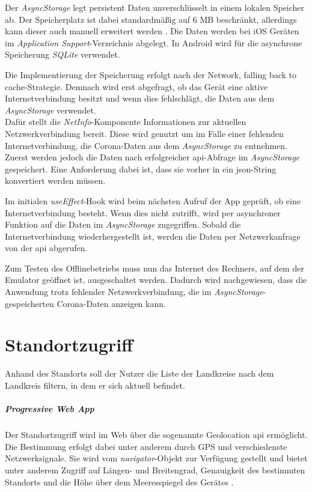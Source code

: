 Der \textit{AsyncStorage} legt persistent Daten unverschlüsselt in einem lokalen Speicher ab.
Der Speicherplatz ist dabei standardmäßig auf 6 MB beschränkt, allerdings kann dieser auch manuell erweitert werden \cite{Behrends.2018}.
Die Daten werden bei iOS Geräten im \textit{Application Support}-Verzeichnis abgelegt.
In Android wird für die asynchrone Speicherung \textit{SQLite} verwendet.

Die Implementierung der Speicherung erfolgt nach der \glqq Network, falling back to cache\grqq{}-Strategie.
Demnach wird erst abgefragt, ob das Gerät eine aktive Internetverbindung besitzt und wenn dies fehlschlägt, die Daten aus dem \textit{AsyncStorage} verwendet.\\
Dafür stellt die \textit{NetInfo}-Komponente Informationen zur aktuellen Netzwerkverbindung bereit.
Diese wird genutzt um im Falle einer fehlenden Internetverbindung, die Corona-Daten aus dem \textit{AsyncStorage} zu entnehmen.\\
Zuerst werden jedoch die Daten nach erfolgreicher \ac{api}-Abfrage im \textit{AsyncStorage} gespeichert.
Eine Anforderung dabei ist, dass sie vorher in ein \ac{json}-String konvertiert werden müssen.

Im initialen \textit{useEffect}-Hook wird beim nächsten Aufruf der App geprüft, ob eine Internetverbindung besteht.
Wenn dies nicht zutrifft, wird per asynchroner Funktion auf die Daten im \textit{AsyncStorage} zugegriffen.
Sobald die Internetverbindung wiederhergestellt ist, werden die Daten per Netzwerkanfrage von der \ac{api} abgerufen.

Zum Testen des Offlinebetriebs muss nun das Internet des Rechners, auf dem der Emulator geöffnet ist, ausgeschaltet werden.
Dadurch wird nachgewiesen, dass die Anwendung trotz fehlender Netzwerkverbindung, die im \textit{AsyncStorage}-gespeicherten Corona-Daten anzeigen kann.

\section{Standortzugriff}
Anhand des Standorts soll der Nutzer die Liste der Landkreise nach dem Landkreis filtern, in dem er sich aktuell befindet.

\subparagraph{Progressive Web App\\}
Der Standortzugriff wird im Web über die sogenannte Geolocation \ac{api} ermöglicht.
Die Bestimmung erfolgt dabei unter anderem durch GPS und verschiedenste Netzwerksignale.
Sie wird vom \textit{navigator}-Objekt zur Verfügung gestellt und bietet unter anderem Zugriff auf Längen- und Breitengrad, Genauigkeit des bestimmten Standorts und die Höhe über dem Meeresspiegel des Gerätes \cite{Caceres.2021b}.

